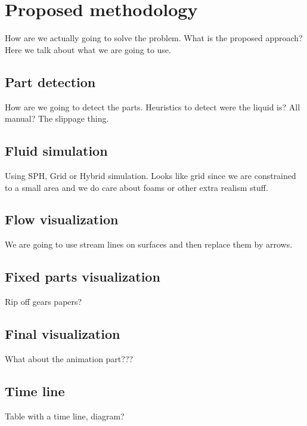 \chapter{Proposed methodology}

How are we actually going to solve the problem.
What is the proposed approach?
Here we talk about what we are going to use.

\section{Part detection}

How are we going to detect the parts.
Heuristics to detect were the liquid is?
All manual? The slippage thing.

\section{Fluid simulation}

Using SPH, Grid or Hybrid simulation.
Looks like grid since we are constrained to a small area and we do care about foams or other extra realism stuff.

\section{Flow visualization}

We are going to use stream lines on surfaces and then replace them by arrows.


\section{Fixed parts visualization}

Rip off gears papers?

\section{Final visualization}
What about the animation part???

\section{Time line}

Table with a time line, diagram?